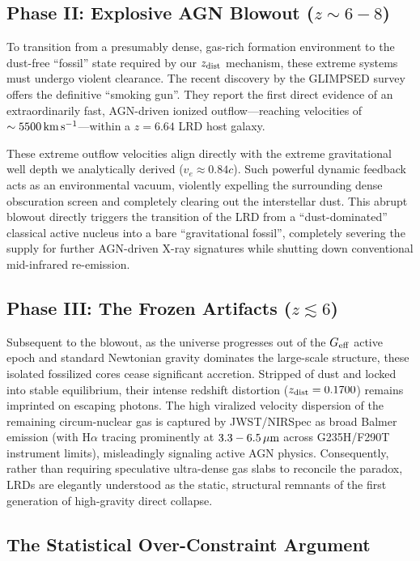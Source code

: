 \documentclass[twocolumn]{aastex631}
\begin{document}
\subsection{Phase II: Explosive AGN Blowout ($z \sim 6-8$)}
To transition from a presumably dense, gas-rich formation environment to the dust-free ``fossil'' state required by our $z_{\rm dist}$ mechanism, these extreme systems must undergo violent clearance. The recent discovery by the GLIMPSED survey \citep{Korber2026} offers the definitive ``smoking gun''. They report the first direct evidence of an extraordinarily fast, AGN-driven ionized outflow---reaching velocities of $\sim 5500 \rm\, km\, s^{-1}$---within a $z=6.64$ LRD host galaxy. 

These extreme outflow velocities align directly with the extreme gravitational well depth we analytically derived ($v_e \approx 0.84c$). Such powerful dynamic feedback acts as an environmental vacuum, violently expelling the surrounding dense obscuration screen and completely clearing out the interstellar dust. This abrupt blowout directly triggers the transition of the LRD from a ``dust-dominated'' classical active nucleus into a bare ``gravitational fossil'', completely severing the supply for further AGN-driven X-ray signatures while shutting down conventional mid-infrared re-emission.

\subsection{Phase III: The Frozen Artifacts ($z \lesssim 6$)}
Subsequent to the blowout, as the universe progresses out of the $G_{\rm eff}$ active epoch and standard Newtonian gravity dominates the large-scale structure, these isolated fossilized cores cease significant accretion. Stripped of dust and locked into stable equilibrium, their intense redshift distortion ($z_{\rm dist} = 0.1700$) remains imprinted on escaping photons. The high viralized velocity dispersion of the remaining circum-nuclear gas is captured by JWST/NIRSpec as broad Balmer emission (with H$\alpha$ tracing prominently at $3.3-6.5\rm\,\mu m$ across G235H/F290T instrument limits), misleadingly signaling active AGN physics. Consequently, rather than requiring speculative ultra-dense gas slabs \citep{Inayoshi2024} to reconcile the paradox, LRDs are elegantly understood as the static, structural remnants of the first generation of high-gravity direct collapse.

\subsection{The Statistical Over-Constraint Argument}
\label{s:overconstraint}
\end{document}
